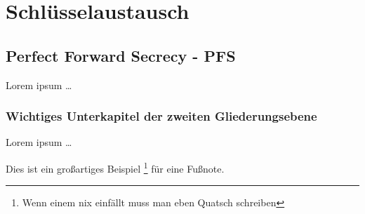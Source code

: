 \chapter{Schlüsselaustausch}

\section{Perfect Forward Secrecy - PFS}
Lorem ipsum \dots

\subsection{Wichtiges Unterkapitel der zweiten Gliederungsebene}
Lorem ipsum \dots

Dies ist ein großartiges Beispiel \footnote{Wenn einem nix einfällt muss man eben Quatsch schreiben} für eine Fußnote.